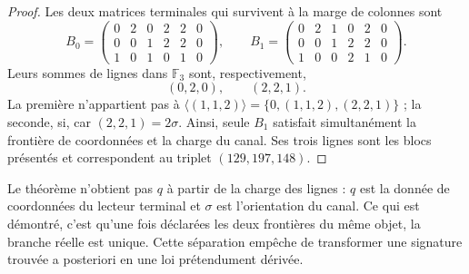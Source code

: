 \begin{proof}
Les deux matrices terminales qui survivent à la marge de colonnes sont
\[
B_0=
\begin{pmatrix}
0&2&0&2&2&0\\
0&0&1&2&2&0\\
1&0&1&0&1&0
\end{pmatrix},
\qquad
B_1=
\begin{pmatrix}
0&2&1&0&2&0\\
0&0&1&2&2&0\\
1&0&0&2&1&0
\end{pmatrix}.
\]
Leurs sommes de lignes dans \(\mathbb F_3\) sont, respectivement,
\[
 (0,2,0),\qquad(2,2,1).
\]
La première n'appartient pas à
\(\langle(1,1,2)\rangle=\{0,(1,1,2),(2,2,1)\}\) ; la seconde, si, car
\((2,2,1)=2\sigma\). Ainsi, seule \(B_1\) satisfait simultanément la
frontière de coordonnées et la charge du canal. Ses trois lignes sont les blocs
présentés et correspondent au triplet \((129,197,148)\).
\end{proof}

Le théorème n'obtient pas \(q\) à partir de la charge des lignes : \(q\) est la donnée
de coordonnées du lecteur terminal et \(\sigma\) est l'orientation du canal.
Ce qui est démontré, c'est qu'une fois déclarées les deux frontières du même objet,
la branche réelle est unique. Cette séparation empêche de transformer une signature trouvée
a posteriori en une loi prétendument dérivée.

